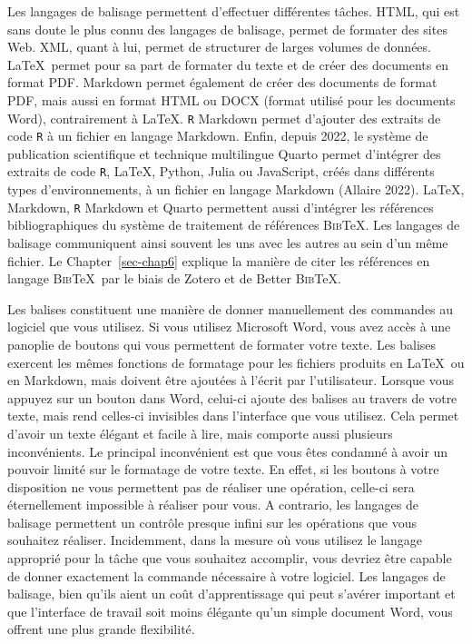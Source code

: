 \documentclass[
  letterpaper,
]{scrbook}
\begin{document}
Les langages de balisage permettent d'effectuer différentes tâches.
HTML, qui est sans doute le plus connu des langages de balisage, permet
de formater des sites Web. XML, quant à lui, permet de structurer de
larges volumes de données. \LaTeX~permet pour sa part de formater du
texte et de créer des documents en format PDF. Markdown permet également
de créer des documents de format PDF, mais aussi en format HTML ou DOCX
(format utilisé pour les documents Word), contrairement à \LaTeX.
\texttt{R} Markdown permet d'ajouter des extraits de code \texttt{R} à
un fichier en langage Markdown. Enfin, depuis 2022, le système de
publication scientifique et technique multilingue Quarto permet
d'intégrer des extraits de code \texttt{R}, \LaTeX, Python, Julia ou
JavaScript, créés dans différents types d'environnements, à un fichier
en langage Markdown (Allaire 2022). \LaTeX, Markdown, \texttt{R}
Markdown et Quarto permettent aussi d'intégrer les références
bibliographiques du système de traitement de références
\textsc{Bib}\TeX. Les langages de balisage communiquent ainsi souvent
les uns avec les autres au sein d'un même fichier. Le
Chapter~\ref{sec-chap6} explique la manière de citer les références en
langage \textsc{Bib}\TeX~par le biais de Zotero et de Better
\textsc{Bib}\TeX.

Les balises constituent une manière de donner manuellement des commandes
au logiciel que vous utilisez. Si vous utilisez Microsoft Word, vous
avez accès à une panoplie de boutons qui vous permettent de formater
votre texte. Les balises exercent les mêmes fonctions de formatage pour
les fichiers produits en \LaTeX~ou en Markdown, mais doivent être
ajoutées à l'écrit par l'utilisateur. Lorsque vous appuyez sur un bouton
dans Word, celui-ci ajoute des balises au travers de votre texte, mais
rend celles-ci invisibles dans l'interface que vous utilisez. Cela
permet d'avoir un texte élégant et facile à lire, mais comporte aussi
plusieurs inconvénients. Le principal inconvénient est que vous êtes
condamné à avoir un pouvoir limité sur le formatage de votre texte. En
effet, si les boutons à votre disposition ne vous permettent pas de
réaliser une opération, celle-ci sera éternellement impossible à
réaliser pour vous. A contrario, les langages de balisage permettent un
contrôle presque infini sur les opérations que vous souhaitez réaliser.
Incidemment, dans la mesure où vous utilisez le langage approprié pour
la tâche que vous souhaitez accomplir, vous devriez être capable de
donner exactement la commande nécessaire à votre logiciel. Les langages
de balisage, bien qu'ils aient un coût d'apprentissage qui peut s'avérer
important et que l'interface de travail soit moins élégante qu'un simple
document Word, vous offrent une plus grande flexibilité.
\end{document}
